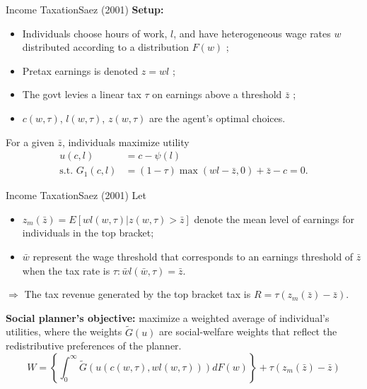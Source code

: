 \documentclass{beamer}
\begin{document}
\begin{frame}{Income Taxation}{Saez (2001)}
	\textbf{Setup:}
	\begin{itemize}
		\item Individuals choose hours of work, $l$, and have heterogeneous wage rates $w$ distributed according to a distribution $F(w)$ ;
		\item Pretax earnings is denoted $z=wl$ ;
		\item The govt levies a linear tax $\tau$ on earnings above a threshold $\bar{z}$ ;
		\item $c(w,\tau)$, $l(w,\tau)$, $z(w,\tau)$ are the agent's optimal choices.
	\end{itemize}
	\medskip

	For a given $\bar{z}$, individuals maximize utility
	\begin{equation}
		\begin{aligned}
			u(c,l) &= c - \psi(l) \\
			\mbox{s.t. }G_1(c,l) &= (1-\tau)\max (wl-\bar{z},0) + \bar{z} - c = 0.
		\end{aligned}
	\end{equation}
\end{frame}
\begin{frame}{Income Taxation}{Saez (2001)}
	Let
	\begin{itemize}
		\item $z_m(\bar{z})=E[wl(w,\tau)|z(w,\tau)>\bar{z}]$ denote the mean level of earnings for individuals in the top bracket;
		\item $\bar{w}$ represent the wage threshold that corresponds to an earnings threshold of $\bar{z}$ when the tax rate is $\tau:\bar{w}l(\bar{w},\tau)=\bar{z}$.
	\end{itemize}
	$\Rightarrow$ The tax revenue generated by the top bracket tax is $R=\tau(z_m(\bar{z})-\bar{z})$.
	\medskip

	\textbf{Social planner’s objective:} maximize a weighted average of individual’s utilities, where the weights $\tilde{G}(u)$ are social-welfare weights that reflect the redistributive preferences of the planner.
	\begin{equation}
		W=\left\{\int_0^\infty \tilde{G}(u(c(w,\tau),wl(w,\tau)))dF(w)\right\} + \tau(z_m(\bar{z})-\bar{z})
	\end{equation}
\end{frame}
\end{document}
